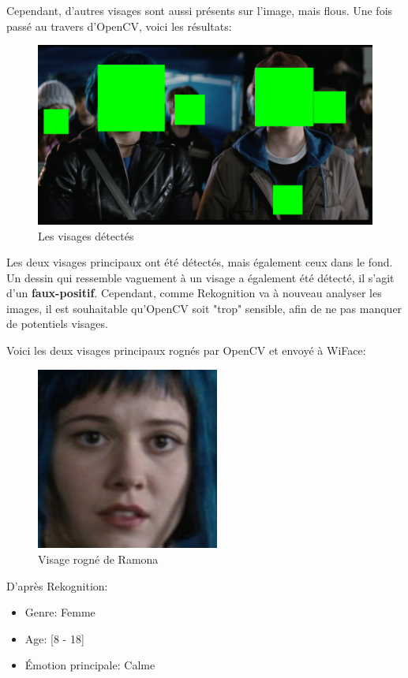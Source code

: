 Cependant, d'autres visages sont aussi présents sur l'image, mais flous. 
Une fois passé au travers d'OpenCV, voici les résultats:

\begin{figure}[H]
	\centering
	\includegraphics[width=12cm]{images/facial_reco/hidden_face.png}
    \caption{Les visages détectés}
	\label{fig:hidden_face}
\end{figure}

Les deux visages principaux ont été détectés, mais également ceux dans le fond.
Un dessin qui ressemble vaguement à un visage a également été détecté, il s'agit d'un \textbf{faux-positif}.
Cependant, comme Rekognition va à nouveau analyser les images, il est souhaitable qu'OpenCV
soit "trop" sensible, afin de ne pas manquer de potentiels visages.

Voici les deux visages principaux rognés par OpenCV et envoyé à WiFace:

\begin{figure}[H]
	\centering
	\includegraphics[width=6cm]{images/facial_reco/ramona.png}
    \caption{Visage rogné de Ramona}
	\label{fig:hidden_face_ramona}
\end{figure}

D'après Rekognition:
\begin{itemize}
    \item Genre: Femme
    \item Age: [8 - 18]
    \item Émotion principale: Calme 
\end{itemize}

